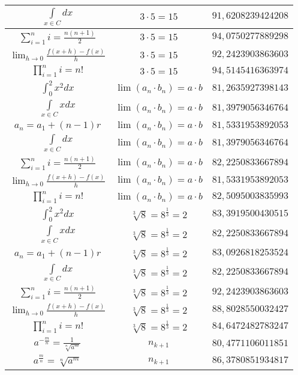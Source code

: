 \documentclass{article}
\begin{document}
\begin{flushleft}
\begin{longtable}{|c|c|c|}
$\int \limits_{x\in C}dx$ & $3\cdot 5=15$ & $91,6208239424208$ \\ \hline 
$\sum_{i=1}^{n}i=\frac{n(n+1)}{2}$ & $3\cdot 5=15$ & $94,0750277889298$ \\ \hline 
$\lim_{h\to0}\frac{f(x+h)-f(x)}{h}$ & $3\cdot 5=15$ & $92,2423903863603$ \\ \hline 
$\prod_{i=1}^ni=n!$ & $3\cdot 5=15$ & $94,5145416363974$ \\ \hline 
$\int _0^2x^2dx$ & $\lim\left(a_n\cdot b_n\right)=a\cdot b$ & $81,2635927398143$ \\ \hline 
$\int \limits_{x\in C}xdx$ & $\lim\left(a_n\cdot b_n\right)=a\cdot b$ & $81,3979056346764$ \\ \hline 
$a_{n}=a_{1}+(n-1)r$ & $\lim\left(a_n\cdot b_n\right)=a\cdot b$ & $81,5331953892053$ \\ \hline 
$\int \limits_{x\in C}dx$ & $\lim\left(a_n\cdot b_n\right)=a\cdot b$ & $81,3979056346764$ \\ \hline 
$\sum_{i=1}^{n}i=\frac{n(n+1)}{2}$ & $\lim\left(a_n\cdot b_n\right)=a\cdot b$ & $82,2250833667894$ \\ \hline 
$\lim_{h\to0}\frac{f(x+h)-f(x)}{h}$ & $\lim\left(a_n\cdot b_n\right)=a\cdot b$ & $81,5331953892053$ \\ \hline 
$\prod_{i=1}^ni=n!$ & $\lim\left(a_n\cdot b_n\right)=a\cdot b$ & $82,5095003835993$ \\ \hline 
$\int _0^2x^2dx$ & $\sqrt[3]{8}=8^{\frac{1}{3}}=2$ & $83,3919500430515$ \\ \hline 
$\int \limits_{x\in C}xdx$ & $\sqrt[3]{8}=8^{\frac{1}{3}}=2$ & $82,2250833667894$ \\ \hline 
$a_{n}=a_{1}+(n-1)r$ & $\sqrt[3]{8}=8^{\frac{1}{3}}=2$ & $83,0926818253524$ \\ \hline 
$\int \limits_{x\in C}dx$ & $\sqrt[3]{8}=8^{\frac{1}{3}}=2$ & $82,2250833667894$ \\ \hline 
$\sum_{i=1}^{n}i=\frac{n(n+1)}{2}$ & $\sqrt[3]{8}=8^{\frac{1}{3}}=2$ & $92,2423903863603$ \\ \hline 
$\lim_{h\to0}\frac{f(x+h)-f(x)}{h}$ & $\sqrt[3]{8}=8^{\frac{1}{3}}=2$ & $88,8028550032427$ \\ \hline 
$\prod_{i=1}^ni=n!$ & $\sqrt[3]{8}=8^{\frac{1}{3}}=2$ & $84,6472482783247$ \\ \hline 
$a^{-\frac{m}{n}}=\frac{1}{\sqrt[n]{a^{m}}}$ & $n_{k+1}$ & $80,4771106011851$ \\ \hline 
$a^{\frac{m}{n}}=\sqrt[n]{a^{m}}$ & $n_{k+1}$ & $86,3780851934817$ \\ \hline 

\end{longtable}
\end{flushleft}
\end{document}
